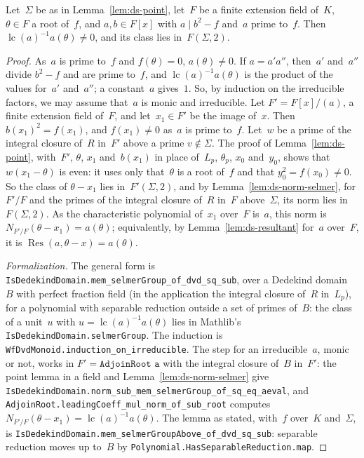 \begin{lemma}
\label{lem:ds-point-mumford}
\leanok
Let~$\Sigma$ be as in Lemma~\ref{lem:ds-point}, let~$F$ be a finite extension field of~$K$,
$\theta \in F$ a root of~$f$, and $a, b \in F[x]$ with $a \mid b^2 - f$ and~$a$ prime to~$f$. Then
$\operatorname{lc}(a)^{-1}a(\theta) \ne 0$, and its class lies in~$F(\Sigma, 2)$.
\end{lemma}

\begin{proof}
\leanok
{}
As~$a$ is prime to~$f$ and $f(\theta) = 0$, $a(\theta) \ne 0$. If $a = a'a''$, then~$a'$
and~$a''$ divide $b^2 - f$ and are prime to~$f$, and $\operatorname{lc}(a)^{-1}a(\theta)$ is the
product of the values for~$a'$ and~$a''$; a constant~$a$ gives~$1$. So, by induction on the
irreducible factors, we may assume that~$a$ is monic and irreducible. Let $F' = F[x]/(a)$, a
finite extension field of~$F$, and let~$x_1 \in F'$ be the image of~$x$. Then
$b(x_1)^2 = f(x_1)$, and $f(x_1) \ne 0$ as~$a$ is prime to~$f$. Let~$w$ be a prime of the integral
closure of~$R$ in~$F'$ above a prime $v \notin \Sigma$. The proof of Lemma~\ref{lem:ds-point},
with~$F'$, $\theta$, $x_1$ and~$b(x_1)$ in place of~$L_p$, $\theta_p$, $x_0$ and~$y_0$, shows that
$w(x_1 - \theta)$ is even: it uses only that~$\theta$ is a root of~$f$ and that
$y_0^2 = f(x_0) \ne 0$. So the class of $\theta - x_1$ lies in~$F'(\Sigma, 2)$, and by
Lemma~\ref{lem:ds-norm-selmer}, for $F'/F$ and the primes of the integral closure of~$R$ in~$F$
above~$\Sigma$, its norm lies in~$F(\Sigma, 2)$. As the characteristic polynomial of~$x_1$ over~$F$
is~$a$, this norm is $N_{F'/F}(\theta - x_1) = a(\theta)$; equivalently, by
Lemma~\ref{lem:ds-resultant} for~$a$ over~$F$, it is $\operatorname{Res}(a, \theta - x) =
a(\theta)$.

\emph{Formalization.} The general form is
\texttt{IsDedekindDomain.mem\_selmerGroup\_of\_dvd\_sq\_sub}, over a Dedekind domain~$B$ with
perfect fraction field (in the application the integral closure of~$R$ in~$L_p$), for a polynomial
with separable reduction outside a set of primes of~$B$: the class of a unit~$u$ with
$u = \operatorname{lc}(a)^{-1}a(\theta)$ lies in Mathlib's \texttt{IsDedekindDomain.selmerGroup}.
The induction is \texttt{WfDvdMonoid.induction\_on\_irreducible}. The step for an irreducible~$a$,
monic or not, works in $F' = \texttt{AdjoinRoot a}$ with the integral closure of~$B$ in~$F'$: the
point lemma in a field and Lemma~\ref{lem:ds-norm-selmer} give
\texttt{IsDedekindDomain.norm\_sub\_mem\_selmerGroup\_of\_sq\_eq\_aeval}, and
\texttt{AdjoinRoot.leadingCoeff\_mul\_norm\_of\_sub\_root} computes
$N_{F'/F}(\theta - x_1) = \operatorname{lc}(a)^{-1}a(\theta)$. The lemma as stated, with~$f$
over~$K$ and~$\Sigma$, is \texttt{IsDedekindDomain.mem\_selmerGroupAbove\_of\_dvd\_sq\_sub}:
separable reduction moves up to~$B$ by \texttt{Polynomial.HasSeparableReduction.map}.
\end{proof}

